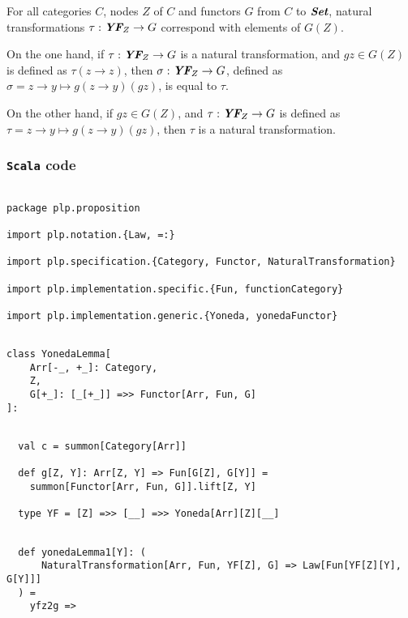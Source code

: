 \documentclass[11pt]{article}
\newcommand{\Set}{\mbox{\bf {\em Set}}}
\newcommand{\YF}{\mbox{\bf {\em YF}}}
\newcommand{\arrow}[2]{#1\!\!\rightarrow\!\!#2}
\newcommand{\code}{\subsubsection{{\tt Scala} code}\begingroup\rm \vspace{12pt}}
\def\edefn{\endgroup\par\pagebreak[2]\addvspace{\medskipamount}}
\let\elemm=\edefn
\begin{document}
For all categories $C$, nodes $Z$ of $C$ and functors $G$ from $C$ to $\Set$, natural transformations
$\tau: \YF_{Z} \rightarrow G$ correspond with elements of $G(Z)$. 

On the one hand, if $\tau: \YF_{Z} \rightarrow G$ is a natural transformation, and $gz \in G(Z)$ is defined as
$\tau(\arrow{z}{z})$, then $\sigma: \YF_{Z} \rightarrow G$, defined as
$\sigma = \arrow{z}{y} \mapsto g(\arrow{z}{y})(gz)$, is equal to $\tau$. 

On the other hand, if $gz \in G(Z)$, and $\tau: \YF_{Z} \rightarrow G$ is defined as
$\tau = \arrow{z}{y} \mapsto g(\arrow{z}{y})(gz)$, then $\tau$ is a natural transformation.
\elemm

\code
\begin{mdframed}[backgroundcolor=lightgray!20] 
\begin{lstlisting}

package plp.proposition

import plp.notation.{Law, =:}

import plp.specification.{Category, Functor, NaturalTransformation}

import plp.implementation.specific.{Fun, functionCategory}

import plp.implementation.generic.{Yoneda, yonedaFunctor}
\end{lstlisting}
\end{mdframed}
\vspace{6pt}
\begin{mdframed}[backgroundcolor=lightgray!20] 
\begin{lstlisting}

class YonedaLemma[
    Arr[-_, +_]: Category,
    Z,
    G[+_]: [_[+_]] =>> Functor[Arr, Fun, G]
]:
\end{lstlisting}
\end{mdframed}
\vspace{6pt}
\begin{mdframed}[backgroundcolor=lightgray!20] 
\begin{lstlisting}

  val c = summon[Category[Arr]]

  def g[Z, Y]: Arr[Z, Y] => Fun[G[Z], G[Y]] =
    summon[Functor[Arr, Fun, G]].lift[Z, Y]

  type YF = [Z] =>> [__] =>> Yoneda[Arr][Z][__]
\end{lstlisting}
\end{mdframed}
\vspace{6pt}
\begin{mdframed}[backgroundcolor=lightgray!20] 
\begin{lstlisting}

  def yonedaLemma1[Y]: (
      NaturalTransformation[Arr, Fun, YF[Z], G] => Law[Fun[YF[Z][Y], G[Y]]]
  ) =
    yfz2g =>
\end{lstlisting}
\end{mdframed}
\end{document}
